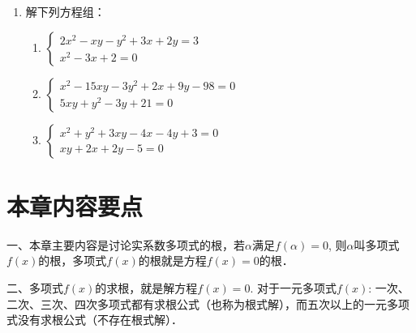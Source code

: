 \begin{enumerate}
\item 解下列方程组：
\begin{enumerate}
    \item $\begin{cases}
      2x^2-xy-y^2+3x+2y=3\\
      x^2-3x+2=0  
    \end{cases}$
    \item $\begin{cases}
        x^2-15xy-3y^2+2x+9y-98=0\\
        5xy+y^2-3y+21=0
    \end{cases}$
    \item $\begin{cases}
        x^2+y^2+3xy-4x-4y+3=0\\
        xy+2x+2y-5=0
    \end{cases}$
    
\end{enumerate}


\end{enumerate}

\section*{本章内容要点}


一、本章主要内容是讨论实系数多项式的根，若$\alpha$满足$f(\alpha)=0$, 则$\alpha$叫多项式$f(x)$的根，多项式$f(x)$的根就是方程$f(x)=0$的根．

二、多项式$f(x)$的求根，就是解方程$f(x)=0$. 对于一元多项式$f(x)$: 一次、二次、三次、四次多项式都有求根公式（也称为根式解），而五次以上的一元多项式没有求根公式（不存在根式解）．

